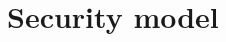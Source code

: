 \documentclass[]{report}
\begin{document}

\dominitoc
{}
\tableofcontents














         

\appendix
\chapter{Security model}

%
\end{document}
